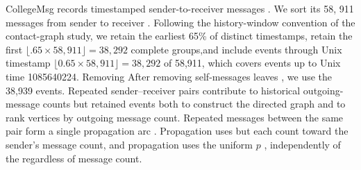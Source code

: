 \documentclass[smallextended]{svjour3}
\providecommand{\DIFaddtex}[1]{{\protect\color{blue} \sf #1}} %
\providecommand{\DIFdeltex}[1]{{\protect\color{red} \scriptsize #1}} %
\providecommand{\DIFaddbegin}{} %
\providecommand{\DIFaddend}{} %
\providecommand{\DIFdelbegin}{} %
\providecommand{\DIFdelend}{} %
\providecommand{\DIFadd}[1]{\texorpdfstring{\DIFaddtex{#1}}{#1}} %
\providecommand{\DIFdel}[1]{\texorpdfstring{\DIFdeltex{#1}}{}} %
\providecommand{\DIFscaledelfig}{0.5}
\newlength{\DIFdelgraphicswidth} %
\newlength{\DIFdelgraphicsheight} %
\providecommand{\DIFaddincludegraphics}[2][]{{\color{blue}\fbox{\DIFOincludegraphics[#1]{#2}}}} %
\providecommand{\DIFdelincludegraphics}[2][]{%
\sbox{\DIFdelgraphicsbox}{\DIFOincludegraphics[#1]{#2}}%
\settoboxwidth{\DIFdelgraphicswidth}{\DIFdelgraphicsbox} %
\settoboxtotalheight{\DIFdelgraphicsheight}{\DIFdelgraphicsbox} %
\scalebox{\DIFscaledelfig}{%
\parbox[b]{\DIFdelgraphicswidth}{\usebox{\DIFdelgraphicsbox}\\[-\baselineskip] \rule{\DIFdelgraphicswidth}{0em}}\llap{\resizebox{\DIFdelgraphicswidth}{\DIFdelgraphicsheight}{%
\setlength{\unitlength}{\DIFdelgraphicswidth}%
\begin{picture}(1,1)%
\thicklines\linethickness{2pt} %
{\color[rgb]{1,0,0}\put(0,0){\framebox(1,1){}}}%
{\color[rgb]{1,0,0}\put(0,0){\line( 1,1){1}}}%
{\color[rgb]{1,0,0}\put(0,1){\line(1,-1){1}}}%
\end{picture}%
}\hspace*{3pt}}} %
} %
\DeclareRobustCommand{\DIFaddbegin}{\DIFOaddbegin \let\includegraphics\DIFaddincludegraphics} %
\DeclareRobustCommand{\DIFaddend}{\DIFOaddend \let\includegraphics\DIFOincludegraphics} %
\DeclareRobustCommand{\DIFdelbegin}{\DIFOdelbegin \let\includegraphics\DIFdelincludegraphics} %
\DeclareRobustCommand{\DIFdelend}{\DIFOaddend \let\includegraphics\DIFOincludegraphics} %
\begin{document}
CollegeMsg records timestamped \DIFdelbegin \DIFdel{sender-to-receiver messages \cite{college}. We sort its 58, 911 }\DIFdelend \DIFaddbegin \DIFadd{messages from sender to receiver \cite{college}. Following the history-window convention of the contact-graph study, we retain the earliest 65\% of }\DIFaddend distinct timestamps, \DIFdelbegin \DIFdel{retain the first $\lfloor .65\times58,911\rfloor=38,292$ complete groups,and include events through Unix timestamp }\DIFdelend \DIFaddbegin \DIFadd{$\lfloor 0.65\times58{,}911\rfloor=38{,}292$ of 58,911, which covers events up to Unix time }\DIFaddend 1085640224. \DIFdelbegin \DIFdel{Removing }\DIFdelend \DIFaddbegin \DIFadd{After removing }\DIFaddend self-messages\DIFdelbegin \DIFdel{leaves }\DIFdelend \DIFaddbegin \DIFadd{, we use the }\DIFaddend 38,939 \DIFdelbegin \DIFdel{events. Repeated sender--receiver pairs contribute to historical outgoing-message counts but }\DIFdelend \DIFaddbegin \DIFadd{retained events both to construct the directed graph and to rank vertices by outgoing message count. Repeated messages between the same pair }\DIFaddend form a single propagation arc \DIFdelbegin \DIFdel{. Propagation uses }\DIFdelend \DIFaddbegin \DIFadd{but each count toward the sender's message count, and propagation uses the }\DIFaddend uniform $p$ \DIFdelbegin \DIFdel{, independently of the }\DIFdelend \DIFaddbegin \DIFadd{regardless of }\DIFaddend message count.
\end{document}
